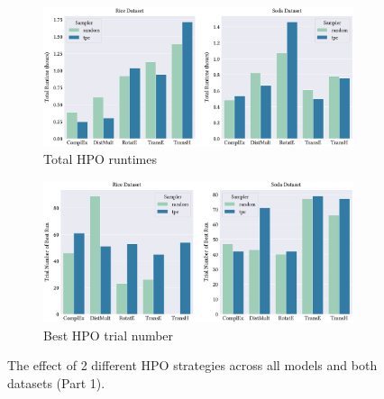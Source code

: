 \begin{figure}[!ht]
    \centering
    \begin{subfigure}[b]{\textwidth}
        \centering
        \includegraphics[width=1\textwidth]{figures/hpo_total_runtime.eps}
        \caption{Total \ac{HPO} runtimes}
        \label{subfig:hpo_total_runtime}
    \end{subfigure}
    
    \begin{subfigure}[b]{\textwidth}
        \centering
        \includegraphics[width=1\textwidth]{figures/hpo_best_trial_number.eps}
        \caption{Best \ac{HPO} trial number}
        \label{subfig:hpo_best_trial_number}
    \end{subfigure}
    
    \caption{The effect of 2 different \ac{HPO} strategies across all models and both datasets (Part 1).}
    \label{fig:effect_of_2_different_HPO_strategies_part1}
\end{figure}

